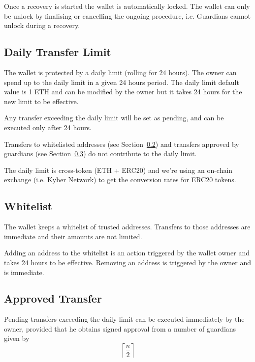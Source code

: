 \documentclass[12pt]{article}
\begin{document}
Once a recovery is started the wallet is automatically locked. The wallet can only be unlock by finalising or cancelling the ongoing procedure, i.e. Guardians cannot unlock during a recovery.

\subsection{Daily Transfer Limit}
\label{sec:dailylimit}
The wallet is protected by a daily limit (rolling for 24 hours). The owner can spend up to the daily limit in a given 24 hours period. The daily limit default value is 1 ETH and can be modified by the owner but it takes 24 hours for the new limit to be effective.

Any transfer exceeding the daily limit will be set as pending, and can be executed only after 24 hours.

Transfers to whitelisted addresses (see Section~\ref{sec:whitelist}) and transfers approved by guardians (see Section~\ref{sec:approved-transfer}) do not contribute to the daily limit.

The daily limit is cross-token (ETH + ERC20) and we're using an on-chain exchange (i.e. Kyber Network) to get the conversion rates for ERC20 tokens.

\subsection{Whitelist}
\label{sec:whitelist}

The wallet keeps a whitelist of trusted addresses. Transfers to those addresses are immediate and their amounts are not limited.

Adding an address to the whitelist is an action triggered by the wallet owner and takes 24 hours to be effective. Removing an address is triggered by the owner and is immediate.

\subsection{Approved Transfer}
\label{sec:approved-transfer}

Pending transfers exceeding the daily limit can be executed immediately by the owner, provided that he obtains signed approval from a number of guardians given by
\begin{equation*}
    \left\lceil {\frac{n}{2}} \right\rceil
\end{equation*}
\end{document}
